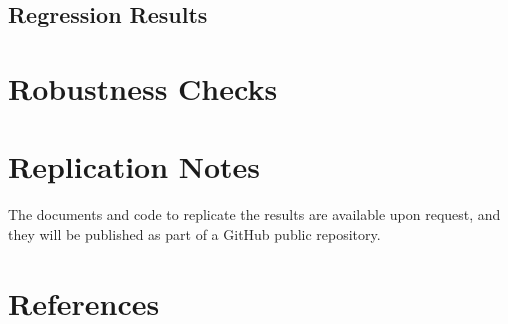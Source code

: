 \documentclass[
  12pt,
  letterpaper,
]{article}
\begin{document}
\subsection{Regression Results}\label{sec-models}

\section{Robustness Checks}\label{sec-robustness}

\section{Replication Notes}\label{replication-notes}

The documents and code to replicate the results are available upon
request, and they will be published as part of a GitHub public
repository.

\newpage{}

\section*{References}\label{references}
\end{document}
